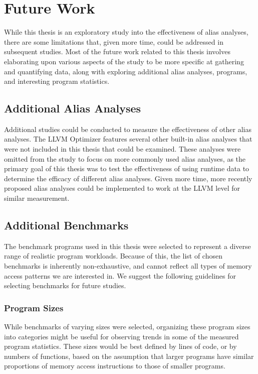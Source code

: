 \chapter{Future Work}

While this thesis is an exploratory study into the effectiveness of alias analyses, there are some limitations that, given more time, could be addressed in subsequent studies. Most of the future work related to this thesis involves elaborating upon various aspects of the study to be more specific at gathering and quantifying data, along with exploring additional alias analyses, programs, and interesting program statistics.

\section{Additional Alias Analyses}
Additional studies could be conducted to measure the effectiveness of other alias analyses. The LLVM Optimizer features several other built-in alias analyses that were not included in this thesis that could be examined. These analyses were omitted from the study to focus on more commonly used alias analyses, as the primary goal of this thesis was to test the effectiveness of using runtime data to determine the efficacy of different alias analyses. Given more time, more recently proposed alias analyses could be implemented to work at the LLVM level for similar measurement.

\section{Additional Benchmarks}
The benchmark programs used in this thesis were selected to represent a diverse range of realistic program workloads. Because of this, the list of chosen benchmarks is inherently non-exhaustive, and cannot reflect all types of memory access patterns we are interested in. We suggest the following guidelines for selecting benchmarks for future studies.

\subsection{Program Sizes}
While benchmarks of varying sizes were selected, organizing these program sizes into categories might be useful for observing trends in some of the measured program statistics. These sizes would be best defined by lines of code, or by numbers of functions, based on the assumption that larger programs have similar proportions of memory access instructions to those of smaller programs.


